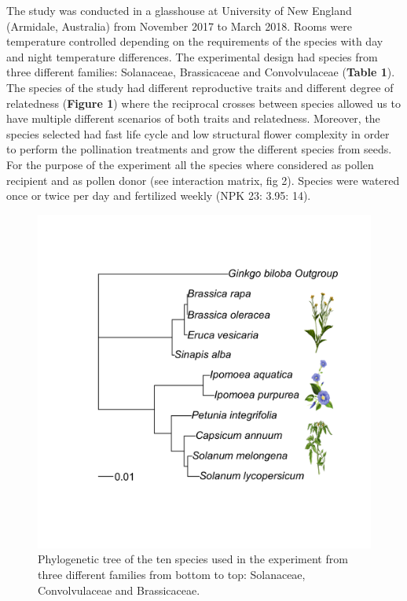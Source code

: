 \documentclass[11pt,a4paper]{article}
\begin{document}
The study was conducted in a glasshouse at University of New England
(Armidale, Australia) from November 2017 to March 2018. Rooms were
temperature controlled depending on the requirements of the species with
day and night temperature differences. The experimental design had
species from three different families: Solanaceae, Brassicaceae and
Convolvulaceae (\textbf{Table 1}). The species of the study had
different reproductive traits and different degree of relatedness
(\textbf{Figure 1}) where the reciprocal crosses between species allowed
us to have multiple different scenarios of both traits and relatedness.
Moreover, the species selected had fast life cycle and low structural
flower complexity in order to perform the pollination treatments and
grow the different species from seeds. For the purpose of the experiment
all the species where considered as pollen recipient and as pollen donor
(see interaction matrix, fig 2). Species were watered once or twice per
day and fertilized weekly (NPK 23: 3.95: 14).

\newpage

\begin{figure}
\includegraphics[width=1\linewidth]{images/phylo_image} \caption{Phylogenetic tree of the ten species used in the experiment from three different families from bottom to top: Solanaceae, Convolvulaceae and Brassicaceae.}\label{fig:unnamed-chunk-1}
\end{figure}
\end{document}
